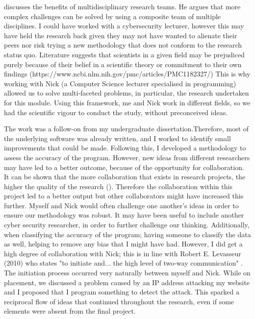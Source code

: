 \cite{thurow1999dynamics} discusses the benefits of multidisciplinary research teams. He argues that more complex challenges can be solved by using a composite team of multiple disciplines. I could have worked with a cybersecurity lecturer, however this may have held the research back given they may not have wanted to alienate their peers nor risk trying a new methodology that does not conform to the research status quo. Literature suggests that scientists in a given field may be prejudiced purely because of their belief in a scientific theory or commitment to their own findings (https://www.ncbi.nlm.nih.gov/pmc/articles/PMC1182327/) This is why working with Nick (a Computer Science lecturer specialised in programming) allowed us to solve multi-faceted problems, in particular, the research undertaken for this module. Using this framework, me and Nick work in different fields, so we had the scientific vigour to conduct the study, without preconceived ideas.

 The work was a follow-on from my undergraduate dissertation.Therefore, most of the underlying software was already written, and I worked to identify small improvements that could be made. Following this, I developed a methodology to assess the accuracy of the program. However, new ideas from different researchers may have led to a better outcome, because of the opportunity for collaboration. It can be shown that the more collaboration that exists in research projects, the higher the quality of the research (\cite{figg2006scientific}). Therefore the collaboration within this project led to a better output but other collaborators might have increased this further. Myself and Nick would often challenge one another's ideas in order to ensure our methodology was robust. It may have been useful to include another cyber security researcher, in order to further challenge our thinking. Additionally, when classifying the accuracy of the program; having someone to classify the data as well, helping to remove any bias that I might have had. However, I did get a high degree of collaboration with Nick; this is in line with Robert E. Levasseur (2010) who states "to initiate and... the high level of two-way communication" . The initiation process occurred very naturally between myself and Nick. While on placement, we discussed a problem caused by an IP address attacking my website and I proposed that I program something to detect the attack. This sparked a reciprocal flow of ideas that continued throughout the research, even if some elements were absent from the final project. 
 
